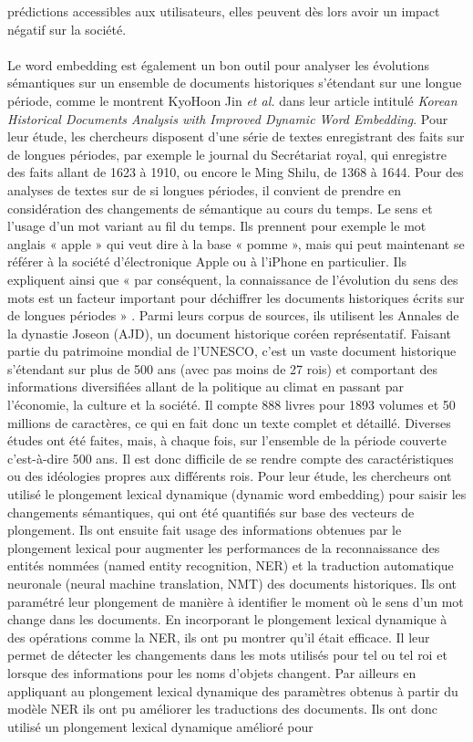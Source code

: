 \documentclass{article}
\begin{document}
prédictions accessibles aux utilisateurs, elles peuvent dès lors avoir un impact négatif sur la société. 
\paragraph{}
Le word embedding est également un bon outil pour analyser les évolutions sémantiques sur un ensemble de documents historiques s’étendant sur une longue période, comme le montrent KyoHoon Jin \textit{et al.} dans leur article intitulé \textit{Korean Historical Documents Analysis with Improved Dynamic Word Embedding}. Pour leur étude, les chercheurs disposent d’une série de textes enregistrant des faits sur de longues périodes, par exemple le journal du Secrétariat royal, qui enregistre des faits allant de 1623 à 1910, ou encore le Ming Shilu, de 1368 à 1644. Pour des analyses de textes sur de si longues périodes, il convient de prendre en considération des changements de sémantique au cours du temps. Le sens et l’usage d’un mot variant au fil du temps. Ils prennent pour exemple le mot anglais « apple » qui veut dire à la base « pomme », mais qui peut maintenant se référer à la société d’électronique Apple ou à l’iPhone en particulier. Ils expliquent ainsi que « par conséquent, la connaissance de l'évolution du sens des mots est un facteur important pour déchiffrer les documents historiques écrits sur de longues périodes » \cite[p. 1]{jin2020korean}. Parmi leurs corpus de sources, ils utilisent les Annales de la dynastie Joseon (AJD), un document historique coréen représentatif. Faisant partie du patrimoine mondial de l’UNESCO, c’est un vaste document historique s’étendant sur plus de 500 ans (avec pas moins de 27 rois) et comportant des informations diversifiées allant de la politique au climat en passant par l’économie, la culture et la société. Il compte 888 livres pour 1893 volumes et 50 millions de caractères, ce qui en fait donc un texte complet et détaillé. Diverses études ont été faites, mais, à chaque fois, sur l’ensemble de la période couverte c’est-à-dire 500 ans. Il est donc difficile de se rendre compte des caractéristiques ou des idéologies propres aux différents rois. Pour leur étude, les chercheurs ont utilisé le plongement lexical dynamique (dynamic word embedding) pour saisir les changements sémantiques, qui ont été quantifiés sur base des vecteurs de plongement. Ils ont ensuite fait usage des informations obtenues par le plongement lexical pour augmenter les performances de la reconnaissance des entités nommées (named entity recognition, NER) et la traduction automatique neuronale (neural machine translation, NMT) des documents historiques. Ils ont paramétré leur plongement de manière à identifier le moment où le sens d’un mot change dans les documents. En incorporant le plongement lexical dynamique à des opérations comme la NER, ils ont pu montrer qu’il était efficace. Il leur permet de détecter les changements dans les mots utilisés pour tel ou tel roi et lorsque des informations pour les noms d’objets changent. Par ailleurs en appliquant au plongement lexical dynamique des paramètres obtenus à partir du modèle NER ils ont pu améliorer les traductions des documents. Ils ont donc utilisé un plongement lexical dynamique amélioré pour 
\end{document}
